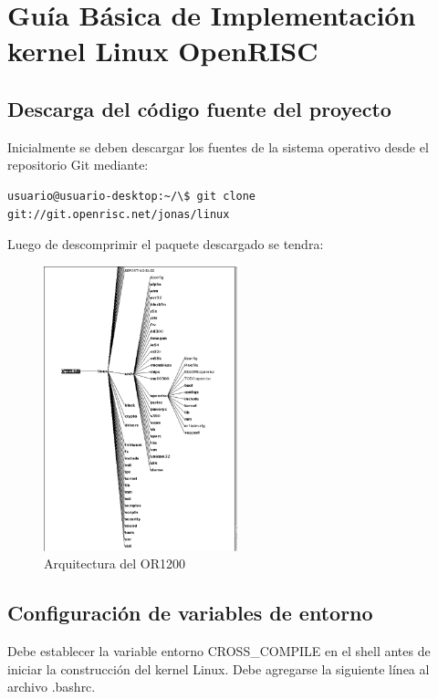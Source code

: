 \chapter{Guía Básica de Implementación kernel Linux OpenRISC} \label{app:apendice4}

\section{Descarga del código fuente del proyecto}

Inicialmente se deben descargar los fuentes de la sistema operativo desde el repositorio Git mediante:


\begin{lstlisting}[breaklines]
 usuario@usuario-desktop:~/\$ git clone git://git.openrisc.net/jonas/linux
\end{lstlisting}

Luego de descomprimir el paquete descargado se tendra:

\begin{figure}[h!]
 	\begin{center}
  	\includegraphics[width=0.5\textwidth,keepaspectratio=true]{./images/kernel}
  	\caption{Arquitectura del OR1200}
  	\label{fig:ArqOR1200}
 	\end{center}
	\end{figure}

\section{Configuración de variables de entorno}

Debe establecer la variable entorno CROSS\_COMPILE en el shell antes de iniciar la construcción del kernel Linux. Debe agregarse la siguiente línea al archivo .bashrc.

